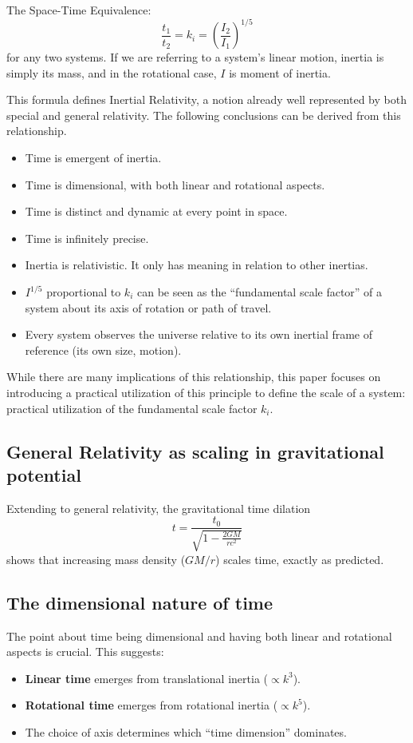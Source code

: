 The Space-Time Equivalence:
\[
\frac{t_1}{t_2} = k_i = \left(\frac{I_2}{I_1}\right)^{1/5}
\]
for any two systems. If we are referring to a system's linear motion, inertia is simply its mass, and in the rotational case, $I$ is moment of inertia.

This formula defines Inertial Relativity, a notion already well represented by both special and general relativity. The following conclusions can be derived from this relationship.
\begin{itemize}[leftmargin=0.5cm]
    \item Time is emergent of inertia.
    \item Time is dimensional, with both linear and rotational aspects.
    \item Time is distinct and dynamic at every point in space.
    \item Time is infinitely precise.
    \item Inertia is relativistic. It only has meaning in relation to other inertias.
    \item $I^{1/5}$ proportional to $k_i$ can be seen as the ``fundamental scale factor'' of a system about its axis of rotation or path of travel.
    \item Every system observes the universe relative to its own inertial frame of reference (its own size, motion).
\end{itemize}
While there are many implications of this relationship, this paper focuses on introducing a practical utilization of this principle to define the scale of a system: practical utilization of the fundamental scale factor $k_i$.

\subsection{General Relativity as scaling in gravitational potential}
Extending to general relativity, the gravitational time dilation
\[
 t = \frac{t_0}{\sqrt{1-\frac{2GM}{rc^2}}}
\]
shows that increasing mass density ($GM/r$) scales time, exactly as predicted.

\subsection{The dimensional nature of time}
The point about time being dimensional and having both linear and rotational aspects is crucial. This suggests:
\begin{itemize}[leftmargin=0.5cm]
    \item \textbf{Linear time} emerges from translational inertia ($\propto k^3$).
    \item \textbf{Rotational time} emerges from rotational inertia ($\propto k^5$).
    \item The choice of axis determines which ``time dimension'' dominates.
\end{itemize}

